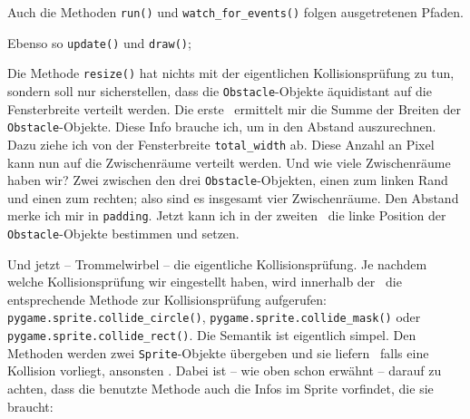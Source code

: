
Auch die Methoden \texttt{run()} und \texttt{watch\_for\_events()} folgen ausgetretenen Pfaden.


Ebenso so \texttt{update()} und \texttt{draw()};


Die Methode \texttt{resize()} hat nichts mit der eigentlichen Kollisionsprüfung zu tun, sondern soll nur sicherstellen, dass die \texttt{Obstacle}-Objekte äquidistant auf die Fensterbreite verteilt werden. Die erste \forSchleife\ ermittelt mir die Summe der Breiten der \texttt{Obstacle}-Objekte. Diese Info brauche ich, um in  den Abstand auszurechnen. Dazu ziehe ich von der Fensterbreite \texttt{total\_width} ab. Diese Anzahl an Pixel kann nun auf die Zwischenräume verteilt werden. Und wie viele Zwischenräume haben wir? Zwei zwischen den drei \texttt{Obstacle}-Objekten, einen zum linken Rand und einen zum rechten; also sind es insgesamt vier Zwischenräume. Den Abstand merke ich mir in \texttt{padding}. Jetzt kann ich in der zweiten \forSchleife\ die linke Position der \texttt{Obstacle}-Objekte bestimmen und setzen.


Und jetzt -- Trommelwirbel -- die eigentliche Kollisionsprüfung. Je nachdem welche Kollisionsprüfung wir eingestellt haben, wird innerhalb der \forSchleife\ die entsprechende Methode zur Kollisionsprüfung aufgerufen: \texttt{pygame.sprite.collide\_circle()}, \texttt{pygame.\-sprite.\-collide\_mask()} oder \texttt{pygame.sprite.collide\_rect()}. Die Semantik ist eigentlich simpel. Den Methoden werden zwei \texttt{Sprite}-Objekte übergeben und sie liefern \true\ falls eine Kollision vorliegt, ansonsten \false. Dabei ist -- wie oben schon erwähnt -- darauf zu achten, dass die benutzte Methode auch die Infos im Sprite vorfindet, die sie braucht:

